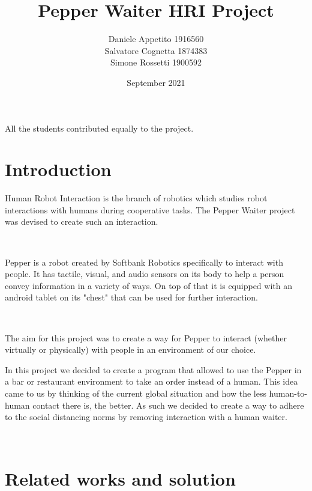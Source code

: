 \documentclass[12pt, letterpaper, twoside]{article}
\title{Pepper Waiter HRI Project}
\author{Daniele Appetito 1916560\\
 Salvatore Cognetta 1874383\\
  Simone Rossetti 1900592}
\date{September 2021}
\begin{document}
\begin{titlepage}
\maketitle
\end{titlepage}

\clearpage
\thispagestyle{empty}
\vspace*{\fill}
All the students contributed equally to the project.
\vspace*{\fill}
\clearpage


\tableofcontents

\newpage
    
\newpage
\section{Introduction}

Human Robot Interaction is the branch of robotics which studies robot interactions with humans during cooperative tasks. The Pepper Waiter project was devised to create such an interaction. 

\

Pepper is a robot created by Softbank Robotics specifically to interact with people. It has tactile, visual, and audio sensors on its body to help a person convey  information in a variety of ways. On top of that it is equipped with an android tablet on its "chest" that can be used for further interaction. 

\

The aim for this project was to create a way for Pepper to interact (whether virtually or physically) with people in an environment of our choice. 

In this project we decided to create a program that allowed to use the Pepper in a bar or restaurant environment to take an order instead of a human. This idea came to us by thinking of the current global situation and how the less human-to-human contact there is, the better. As such we decided to create a way to adhere to the social distancing norms by removing interaction with a human waiter. 


\


\section{Related works and solution}
\end{document}
